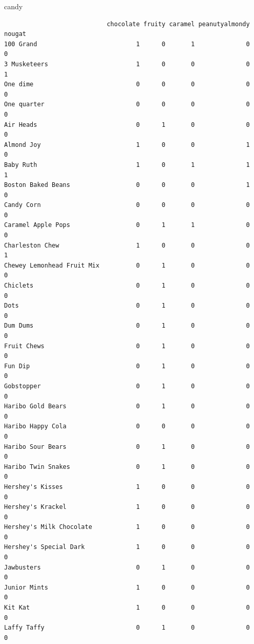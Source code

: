 \documentclass[
  letterpaper,
  DIV=11,
  numbers=noendperiod]{scrartcl}
\newenvironment{Shaded}{\begin{snugshade}}{\end{snugshade}}
\newcommand{\NormalTok}[1]{\textcolor[rgb]{0.00,0.23,0.31}{#1}}
\begin{document}
\begin{Shaded}
\begin{Highlighting}[]
\NormalTok{candy}
\end{Highlighting}
\end{Shaded}

\begin{verbatim}
                            chocolate fruity caramel peanutyalmondy nougat
100 Grand                           1      0       1              0      0
3 Musketeers                        1      0       0              0      1
One dime                            0      0       0              0      0
One quarter                         0      0       0              0      0
Air Heads                           0      1       0              0      0
Almond Joy                          1      0       0              1      0
Baby Ruth                           1      0       1              1      1
Boston Baked Beans                  0      0       0              1      0
Candy Corn                          0      0       0              0      0
Caramel Apple Pops                  0      1       1              0      0
Charleston Chew                     1      0       0              0      1
Chewey Lemonhead Fruit Mix          0      1       0              0      0
Chiclets                            0      1       0              0      0
Dots                                0      1       0              0      0
Dum Dums                            0      1       0              0      0
Fruit Chews                         0      1       0              0      0
Fun Dip                             0      1       0              0      0
Gobstopper                          0      1       0              0      0
Haribo Gold Bears                   0      1       0              0      0
Haribo Happy Cola                   0      0       0              0      0
Haribo Sour Bears                   0      1       0              0      0
Haribo Twin Snakes                  0      1       0              0      0
Hershey's Kisses                    1      0       0              0      0
Hershey's Krackel                   1      0       0              0      0
Hershey's Milk Chocolate            1      0       0              0      0
Hershey's Special Dark              1      0       0              0      0
Jawbusters                          0      1       0              0      0
Junior Mints                        1      0       0              0      0
Kit Kat                             1      0       0              0      0
Laffy Taffy                         0      1       0              0      0

\end{verbatim}
\end{document}
